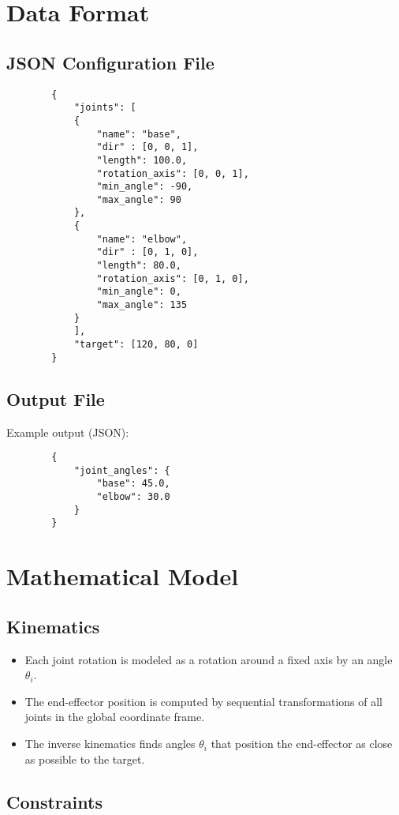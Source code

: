 \documentclass[a4paper,11pt]{article}
\begin{document}
	\section{Data Format}
	
	\subsection{JSON Configuration File}
	
	\begin{verbatim}
		{
			"joints": [
			{
				"name": "base",
				"dir" : [0, 0, 1],
				"length": 100.0,
				"rotation_axis": [0, 0, 1],
				"min_angle": -90,
				"max_angle": 90
			},
			{
				"name": "elbow",
				"dir" : [0, 1, 0],
				"length": 80.0,
				"rotation_axis": [0, 1, 0],
				"min_angle": 0,
				"max_angle": 135
			}
			],
			"target": [120, 80, 0]
		}
	\end{verbatim}
	
	\subsection{Output File}
	
	Example output (JSON):
	
	\begin{verbatim}
		{
			"joint_angles": {
				"base": 45.0,
				"elbow": 30.0
			}
		}
	\end{verbatim}
	
	\section{Mathematical Model}
	
	\subsection{Kinematics}
	
	\begin{itemize}
		\item Each joint rotation is modeled as a rotation around a fixed axis by an angle $\theta_i$.
		\item The end-effector position is computed by sequential transformations of all joints in the global coordinate frame.
		\item The inverse kinematics finds angles $\theta_i$ that position the end-effector as close as possible to the target.
	\end{itemize}
	
	\subsection{Constraints}
	
\end{document}

